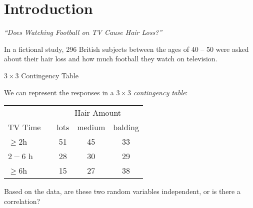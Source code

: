 \section{Introduction}

\begin{frame}{\emph{``Does Watching Football on TV Cause Hair Loss?''}}
    
    In a fictional study, 296 British subjects between the ages of 40 -- 50 were asked about their hair loss and how much football they watch on television.
        
    \begin{block}{$3 \times 3$ Contingency Table}

    We can represent the responses in a $3\times 3$ \emph{contingency table}:

    \begin{table}[h]
        \begin{tabular}{@{}lcccc@{}} 
        & &  \multicolumn{3}{c}{Hair Amount}\\\cmidrule{3-5} 
        TV Time & & lots & medium & balding\\ \midrule 
        $\geq 2$h & & 51 & 45 & 33 \\ 
        $2-6$ h & & 28 & 30 & 29 \\ 
        $\geq 6$h & & 15 & 27 & 38\\\bottomrule
        \end{tabular}
    \end{table} 
    \end{block}

    Based on the data, are these two random variables independent, or is there a correlation?

\end{frame}

